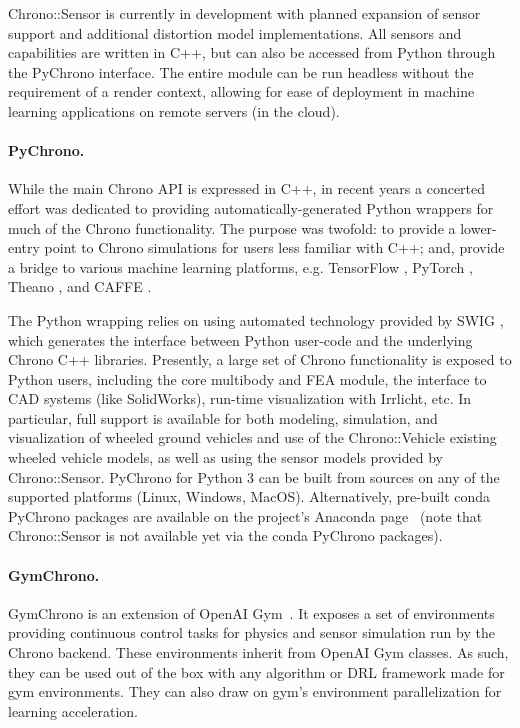 \documentclass[12pt,twocolumn]{article}
\begin{document}
Chrono::Sensor is currently in development with planned expansion of sensor support and additional distortion model implementations. All sensors and capabilities are written in C++, but can also be accessed from Python through the PyChrono interface. The entire module can be run headless without the requirement of a render context, allowing for ease of deployment in machine learning applications on remote servers (in the cloud).


\paragraph{PyChrono.} While the main Chrono API is expressed in C++, in recent years a concerted effort was dedicated to providing automatically-generated Python wrappers for much of the Chrono functionality. The purpose was twofold: to provide a lower-entry point to Chrono simulations for users less familiar with C++; and, provide a bridge to various machine learning platforms, e.g. TensorFlow \cite{tensorflow}, PyTorch \cite{paszke2017PyTorch}, Theano \cite{theano2016}, and CAFFE \cite{caffe2014}.  

The Python wrapping relies on using automated technology provided by SWIG \cite{swig2003}, which generates the interface between Python user-code and the underlying Chrono C++ libraries. Presently, a large set of Chrono functionality is exposed to Python users, including the core multibody and FEA module, the interface to CAD systems (like SolidWorks), run-time visualization with Irrlicht, etc. In particular, full support is available for both modeling, simulation, and visualization of wheeled ground vehicles and use of the Chrono::Vehicle existing wheeled vehicle models, as well as using the sensor models provided by Chrono::Sensor. PyChrono for Python 3 can be built from sources on any of the supported platforms (Linux, Windows, MacOS).  Alternatively, pre-built conda PyChrono packages are available on the project's Anaconda page~\cite{pyChronoCondaWebSite} (note that Chrono::Sensor is not available yet via the conda PyChrono packages). 

\paragraph{GymChrono.} GymChrono is an extension of OpenAI Gym~\cite{Brockman16Gym}. It exposes a set of environments providing continuous control tasks for physics and sensor simulation run by the Chrono backend. These environments inherit from OpenAI Gym classes. As such, they can be used out of the box with any algorithm or DRL framework made for gym environments. They can also draw on gym's environment parallelization for learning acceleration.
\end{document}
